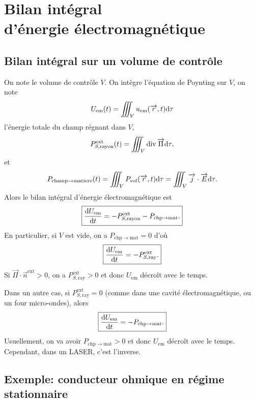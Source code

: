 \section{Bilan intégral\texorpdfstring{\\}{ }d'énergie électromagnétique}
\subsection{Bilan intégral sur un volume de contrôle}

On note le volume de contrôle $V$. On intègre l'équation de Poynting sur $V$, on note 
\begin{equation}
    U_{\mathrm{em}}(t)=\iiint_{V}u_{\mathrm{em}}(\protect\overrightarrow{{r}},t)\mathrm{d}\tau
\end{equation}
l'énergie totale du champ régnant dans $V$,
\begin{equation}
    P_{S,\mathrm{rayon}}^{\mathrm{ext}}(t)=\iiint_{V}\operatorname{div}\protect\overrightarrow{{\Pi}}\mathrm{d}\tau,
\end{equation}
et
\begin{equation}
    P_{\mathrm{champ}\to\mathrm{matiere}}(t)=\iiint_{V}P_{\mathrm{vol}}(\protect\overrightarrow{{r}},t)\mathrm{d}\tau=\iiint_{V}\protect\overrightarrow{{j}}\cdot\protect\overrightarrow{{E}}\mathrm{d}\tau.
\end{equation}
Alors le bilan intégral d'énergie électromagnétique est
\begin{equation}
    \boxed{
        \frac{\mathrm{d} U_{\mathrm{em}}}{\mathrm{d} t}=-P_{S,\mathrm{rayon}}^{\mathrm{ext}}-P_{\mathrm{chp}\to\mathrm{mat}}.
    }
\end{equation}
En particulier, si $V$ est vide, on a $P_{\mathrm{chp}\to\mathrm{mat}}=0$ d'où 
\begin{equation}
    \boxed{
        \frac{\mathrm{d} U_{\mathrm{em}}}{\mathrm{d} t}=-P_{S,\mathrm{ray}}^{\mathrm{ext}}.
    }
\end{equation}
Si $\vec{\Pi}\cdot\vec{n}^{\mathrm{ext}}>0$, on a $P_{S,\mathrm{ray}}^{\mathrm{ext}}>0$ et donc $U_{\mathrm{em}}$ décroît avec le temps.

Dans un autre cas, si $P_{S,\mathrm{ray}}^{\mathrm{ext}}=0$ (comme dans une cavité électromagnétique, ou un four micro-ondes), alors 
\begin{equation}
    \boxed{
        \frac{\mathrm{d} U_{\mathrm{em}}}{\mathrm{d} t}=-P_{\mathrm{chp}\to\mathrm{mat}}.
    }
\end{equation}
Usuellement, on va avoir $P_{\mathrm{chp}\to\mathrm{mat}}>0$ et donc $U_{\mathrm{em}}$ décroît avec le temps. Cependant, dans un LASER, c'est l'inverse.

\subsection{Exemple: conducteur ohmique en régime stationnaire}

